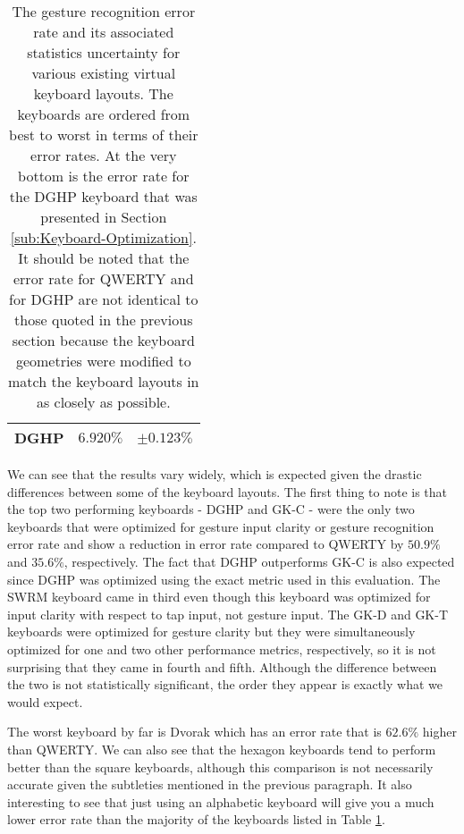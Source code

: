 \documentclass[final,1p,times,authoryear]{elsarticle}
\begin{document}
\begin{table}[!th]
\begin{tabular}{l*{2}{c}}
\hline
DGHP				& $6.920\%$ & $\pm0.123\%$ \\
\hline
\end{tabular}
\caption{The gesture recognition error rate and its associated statistics uncertainty for various
existing virtual keyboard layouts. The keyboards are ordered from best to worst in terms of their
error rates. At the very bottom is the error rate for the DGHP keyboard that was presented in Section \ref{sub:Keyboard-Optimization}.
It should be noted that the error rate for QWERTY and for DGHP are not identical to those quoted in the previous section because the keyboard geometries were modified to match the keyboard layouts in \cite{fastSwiping} as closely as possible.}
\label{table:keyboard_evaluations}
\end{table}

We can see that the results vary widely, which is expected given the drastic differences between some of the keyboard layouts.
The first thing to note is that the top two performing keyboards - DGHP and GK-C - were the only two keyboards that were optimized for gesture input clarity or gesture recognition error rate and show a reduction in error rate compared to QWERTY by $50.9\%$ and $35.6\%$, respectively.
The fact that DGHP outperforms GK-C is also expected since DGHP was optimized using the exact metric used in this evaluation.
The SWRM keyboard came in third even though this keyboard was optimized for input clarity with respect to tap input, not gesture input.
The GK-D and GK-T keyboards were optimized for gesture clarity but they were simultaneously optimized for one and two other performance metrics, respectively, so it is not surprising that they came in fourth and fifth.
Although the difference between the two is not statistically significant, the order they appear is exactly what we would expect. 

The worst keyboard by far is Dvorak which has an error rate that is $62.6\%$ higher than QWERTY.
We can also see that the hexagon keyboards tend to perform better than the square keyboards, although this comparison is not necessarily accurate given the subtleties mentioned in the previous paragraph.
It also interesting to see that just using an alphabetic keyboard will give you a much lower error rate than the majority of the keyboards listed in Table \ref{table:keyboard_evaluations}.
\end{document}
